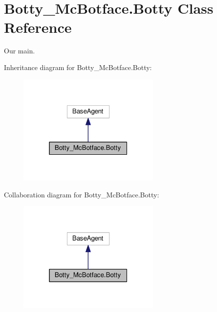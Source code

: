 \hypertarget{classBotty__McBotface_1_1Botty}{}\section{Botty\+\_\+\+Mc\+Botface.\+Botty Class Reference}
\label{classBotty__McBotface_1_1Botty}


Our \textquotesingle{}main\textquotesingle{}.  




Inheritance diagram for Botty\+\_\+\+Mc\+Botface.\+Botty\+:\nopagebreak
\begin{figure}[H]
\begin{center}
\leavevmode
\includegraphics[width=199pt]{classBotty__McBotface_1_1Botty__inherit__graph}
\end{center}
\end{figure}


Collaboration diagram for Botty\+\_\+\+Mc\+Botface.\+Botty\+:\nopagebreak
\begin{figure}[H]
\begin{center}
\leavevmode
\includegraphics[width=199pt]{classBotty__McBotface_1_1Botty__coll__graph}
\end{center}
\end{figure}
